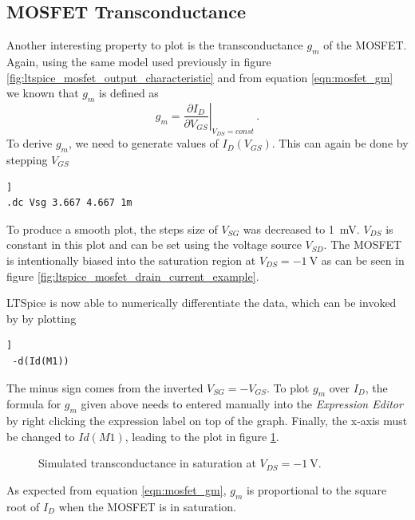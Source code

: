 \documentclass[12pt]{book}
\begin{document}
\subsection{MOSFET Transconductance}
Another interesting property to plot is the transconductance $g_m$ of the MOSFET. Again, using the same model used previously in figure \ref{fig:ltspice_mosfet_output_characteristic} and from equation \ref{eqn:mosfet_gm} we known that $g_m$ is defined as
\begin{equation*}
    g_{m} = \left. \frac{\partial I_{D}}{\partial V_{GS}} \right|_{V_{DS} = const} \,.
\end{equation*}
To derive $g_m$, we need to generate values of $I_D(V_{GS})$. This can again be done by stepping $V_{GS}$
\begin{lstlisting}[frame=single, xleftmargin=5mm, xrightmargin=5mm, columns=fullflexible, morekeywords={model, dc}, keywordstyle=\bfseries, basicstyle=\rmfamily]]
.dc Vsg 3.667 4.667 1m
\end{lstlisting}
To produce a smooth plot, the steps size of $V_{SG}$ was decreased to \qty{1}{\mV}. $V_{DS}$ is constant in this plot and can be set using the voltage source $V_{SD}$. The MOSFET is intentionally biased into the saturation region at $V_{DS} = \qty{-1}{\V}$ as can be seen in figure \ref{fig:ltspice_mosfet_drain_current_example}.

LTSpice is now able to numerically differentiate the data, which can be invoked by by plotting
\begin{lstlisting}[frame=single, xleftmargin=5mm, xrightmargin=5mm, columns=fullflexible, morekeywords={model, dc}, keywordstyle=\bfseries, basicstyle=\rmfamily]]
 -d(Id(M1))
\end{lstlisting}

The minus sign comes from the inverted $V_{SG} = -V_{GS}$. To plot $g_m$ over $I_D$, the formula for $g_m$ given above needs to entered manually into the \textit{Expression Editor} by right clicking the expression label on top of the graph. Finally, the x-axis must be changed to $Id(M1)$, leading to the plot in figure \ref{fig:ltspice_mosfet_gm_example}.
\begin{figure}[hb]
    \centering
    
    \caption{Simulated transconductance in saturation at $V_{DS} = \qty{-1}{\V}$.}
    \label{fig:ltspice_mosfet_gm_example}
\end{figure}

As expected from equation \ref{eqn:mosfet_gm}, $g_m$ is proportional to the square root of $I_D$ when the MOSFET is in saturation.
\end{document}
